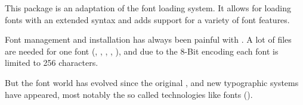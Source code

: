 

\typesetdocumenttitle

\beginabstractcontent
  This package is an adaptation of the \CONTEXT font loading system.
  It allows for loading \OpenType fonts with an extended syntax and adds
  support for a variety of font features.
\endabstractcontent

\tableofcontents


Font management and installation has always been painful with \TEX.  A
lot of files are needed for one font (, ,
, , ), and due to the 8-Bit encoding
each font is limited to 256 characters.

But the font world has evolved since the original \TEX, and new
typographic systems have appeared, most notably the so called
 technologies like \OpenType fonts ().

